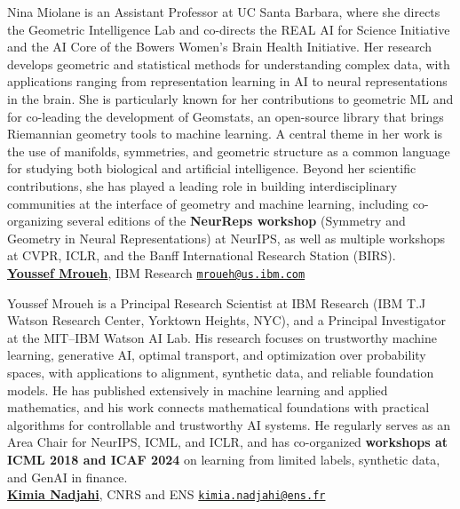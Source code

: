 \documentclass{article}
\begin{document}
Nina Miolane is an Assistant Professor at UC Santa Barbara, where she directs the Geometric Intelligence Lab and co-directs the REAL AI for Science Initiative and the AI Core of the Bowers Women's Brain Health Initiative. Her research develops geometric and statistical methods for understanding complex data, with applications ranging from representation learning in AI to neural representations in the brain. She is particularly known for her contributions to geometric ML and for co-leading the development of Geomstats, an open-source library that brings Riemannian geometry tools to machine learning. A central theme in her work is the use of manifolds, symmetries, and geometric structure as a common language for studying both biological and artificial intelligence. Beyond her scientific contributions, she has played a leading role in building interdisciplinary communities at the interface of geometry and machine learning, including co-organizing several editions of the \textbf{NeurReps workshop} (Symmetry and Geometry in Neural Representations) at NeurIPS, as well as multiple workshops at CVPR, ICLR, and the Banff International Research Station (BIRS). \\

\href{https://research.ibm.com/people/youssef-mroueh}{\textbf{Youssef Mroueh}}, IBM Research \hfill \href{mailto:mroueh@us.ibm.com}{\texttt{mroueh@us.ibm.com}} 

Youssef Mroueh is a Principal Research Scientist at IBM Research (IBM T.J Watson Research Center, Yorktown Heights, NYC), and a Principal Investigator at the MIT–IBM Watson AI Lab. His research focuses on trustworthy machine learning, generative AI, optimal transport, and optimization over probability spaces, with applications to alignment, synthetic data, and reliable foundation models. He has published extensively in machine learning and applied mathematics, and his work connects mathematical foundations with practical algorithms for controllable and trustworthy AI systems. He regularly serves as an Area Chair for NeurIPS, ICML, and ICLR, and has co-organized \textbf{workshops at ICML 2018 and ICAF 2024} on learning from limited labels,  synthetic data, and GenAI in finance. \\

\href{https://kimiandj.github.io/}{\textbf{Kimia Nadjahi}}, CNRS and ENS \hfill \href{mailto:kimia.nadjahi@ens.fr}{\texttt{kimia.nadjahi@ens.fr}}
\end{document}
